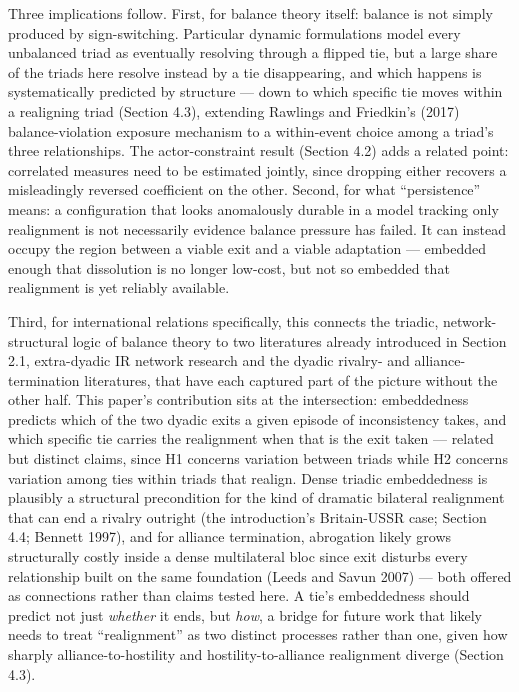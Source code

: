 \documentclass[Afour,sageh,times,doublespace]{sagej}
\begin{document}
Three implications follow. First, for balance theory itself: balance is not simply produced by sign-switching. Particular dynamic formulations model every unbalanced triad as eventually resolving through a flipped tie, but a large share of the triads here resolve instead by a tie disappearing, and which happens is systematically predicted by structure --- down to which specific tie moves within a realigning triad (Section 4.3), extending Rawlings and Friedkin's (2017) balance-violation exposure mechanism to a within-event choice among a triad's three relationships. The actor-constraint result (Section 4.2) adds a related point: correlated measures need to be estimated jointly, since dropping either recovers a misleadingly reversed coefficient on the other. Second, for what ``persistence'' means: a configuration that looks anomalously durable in a model tracking only realignment is not necessarily evidence balance pressure has failed. It can instead occupy the region between a viable exit and a viable adaptation --- embedded enough that dissolution is no longer low-cost, but not so embedded that realignment is yet reliably available.

Third, for international relations specifically, this connects the triadic, network-structural logic of balance theory to two literatures already introduced in Section 2.1, extra-dyadic IR network research and the dyadic rivalry- and alliance-termination literatures, that have each captured part of the picture without the other half. This paper's contribution sits at the intersection: embeddedness predicts which of the two dyadic exits a given episode of inconsistency takes, and which specific tie carries the realignment when that is the exit taken --- related but distinct claims, since H1 concerns variation between triads while H2 concerns variation among ties within triads that realign. Dense triadic embeddedness is plausibly a structural precondition for the kind of dramatic bilateral realignment that can end a rivalry outright (the introduction's Britain-USSR case; Section 4.4; Bennett 1997), and for alliance termination, abrogation likely grows structurally costly inside a dense multilateral bloc since exit disturbs every relationship built on the same foundation (Leeds and Savun 2007) --- both offered as connections rather than claims tested here. A tie's embeddedness should predict not just \emph{whether} it ends, but \emph{how}, a bridge for future work that likely needs to treat ``realignment'' as two distinct processes rather than one, given how sharply alliance-to-hostility and hostility-to-alliance realignment diverge (Section 4.3).
\end{document}
